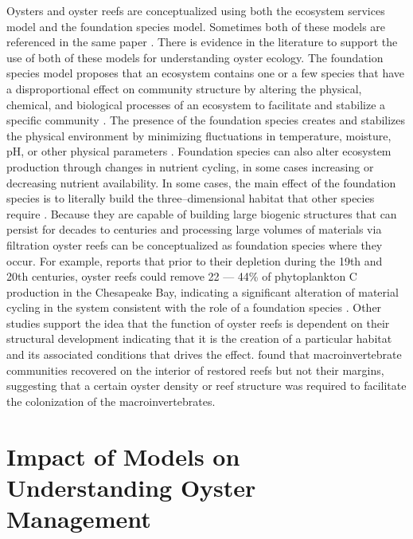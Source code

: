 \documentclass{article}
\begin{document}
Oysters and oyster reefs are conceptualized using both the ecosystem services model and the foundation species model. Sometimes both of these models are referenced in the same paper \cite{mercaldo-allen_oyster_2023}. There is evidence in the literature to support the use of both of these models for understanding oyster ecology. The foundation species model proposes that an ecosystem contains one or a few species that have a disproportional effect on community structure by altering the physical, chemical, and biological processes of an ecosystem to facilitate and stabilize a specific community \cite{fields_foundation_2022}. The presence of the foundation species creates and stabilizes the physical environment by minimizing fluctuations in temperature, moisture, pH, or other physical parameters \cite{ellison_loss_2005}. Foundation species can also alter ecosystem production through changes in nutrient cycling, in some cases increasing \cite{fields_foundation_2022} or decreasing \cite{ellison_loss_2005} nutrient availability. In some cases, the main effect of the foundation species is to literally build the three--dimensional habitat that other species require \cite{mercaldo-allen_oyster_2023}. Because they are capable of building large biogenic structures that can persist for decades to centuries \cite{lockwood_conservation_2019} and processing large volumes of materials via filtration \cite{newell_ecological_1988} oyster reefs can be conceptualized as foundation species where they occur. For example,  reports that prior to their depletion during the 19th and 20th centuries, oyster reefs could remove 22 --- 44\% of phytoplankton C production in the Chesapeake Bay, indicating a significant alteration of material cycling in the system consistent with the role of a foundation species \cite{fields_foundation_2022}. Other studies support the idea that the function of oyster reefs is dependent on their structural development indicating that it is the creation of a particular habitat and its associated conditions that drives the effect.  found that macroinvertebrate communities recovered on the interior of restored reefs but not their margins, suggesting that a certain oyster density or reef structure was required to facilitate the colonization of the macroinvertebrates.


\section{Impact of Models on Understanding Oyster Management}








\end{document}
